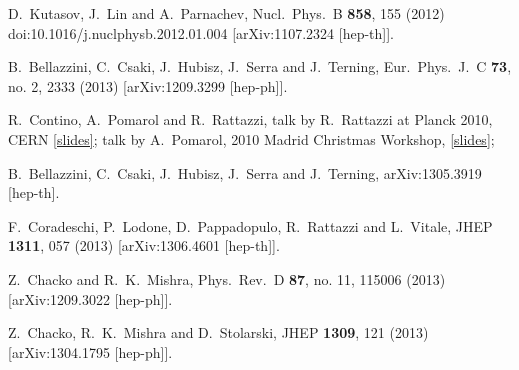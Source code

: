 \documentclass[12pt]{article}
\begin{document}
\begin{thebibliography}{99}
  D.~Kutasov, J.~Lin and A.~Parnachev,
  Nucl.\ Phys.\ B {\bf 858}, 155 (2012)
  doi:10.1016/j.nuclphysb.2012.01.004
  [arXiv:1107.2324 [hep-th]].

  B.~Bellazzini, C.~Csaki, J.~Hubisz, J.~Serra and J.~Terning,
  Eur.\ Phys.\ J.\ C {\bf 73}, no. 2, 2333 (2013)
  [arXiv:1209.3299 [hep-ph]].
  

  
  




R.~Contino, A.~Pomarol and R.~Rattazzi, talk by R.~Rattazzi at Planck 2010, CERN
\href{http://indico.cern.ch/getFile.py/access?contribId=163&resId=0&materialId=slides&confId=75810}{[slides]}; talk by A.~Pomarol, 2010 Madrid Christmas Workshop, \href{http://www.ift.uam.es/workshops/Xmas10/doc/pomarol.pdf}{[slides]}; 
   
  B.~Bellazzini, C.~Csaki, J.~Hubisz, J.~Serra and J.~Terning,
  arXiv:1305.3919 [hep-th].

  F.~Coradeschi, P.~Lodone, D.~Pappadopulo, R.~Rattazzi and L.~Vitale,
  JHEP {\bf 1311}, 057 (2013)
  [arXiv:1306.4601 [hep-th]].
  
  Z.~Chacko and R.~K.~Mishra,
  Phys.\ Rev.\ D {\bf 87}, no. 11, 115006 (2013)
  [arXiv:1209.3022 [hep-ph]].
  
  Z.~Chacko, R.~K.~Mishra and D.~Stolarski,
  JHEP {\bf 1309}, 121 (2013)
  [arXiv:1304.1795 [hep-ph]].
  

\end{thebibliography}
\end{document}
